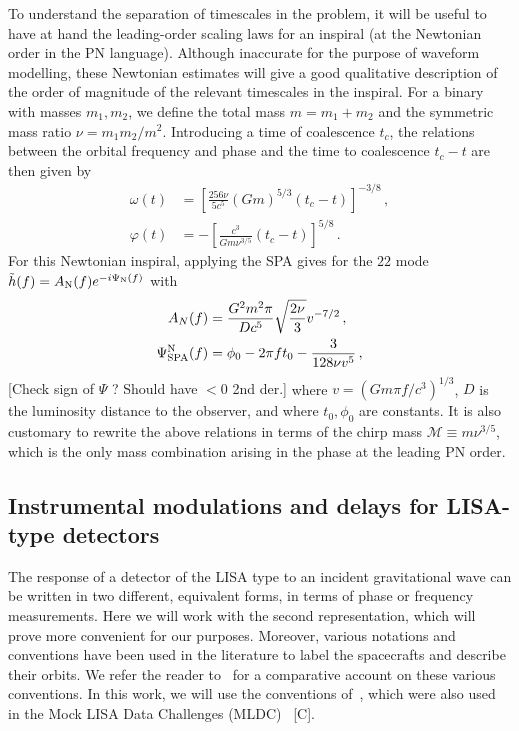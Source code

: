 \documentclass[aps,showpacs,twocolumn,
prd,superscriptaddress,nofootinbib]{revtex4-1}
\newcommand\calM{{\mathcal{M}}}
\newcommand{\SM}[1]{{\color{Red} #1}}
\begin{document}
To understand the separation of timescales in the problem, it will be useful to have at hand the leading-order scaling laws for an inspiral (at the Newtonian order in the PN language). Although inaccurate for the purpose of waveform modelling, these Newtonian estimates will give a good qualitative description of the order of magnitude of the relevant timescales in the inspiral. For a binary with masses $m_{1}, m_{2}$, we define the total mass $m=m_{1}+m_{2}$ and the symmetric mass ratio $\nu = m_{1}m_{2}/m^{2}$. Introducing a time of coalescence $t_{c}$, the relations between the orbital frequency and phase and the time to coalescence $t_{c} - t$ are then given by
\begin{subequations}
\begin{align}
	\omega(t) &= \left[ \frac{256\nu}{5c^{5}} (Gm)^{5/3} (t_{c}-t) \right]^{-3/8} \,, \\
	\varphi(t) &= -\left[ \frac{c^{3}}{G m \nu^{3/5}} (t_{c}-t) \right]^{5/8} \,.
\end{align}
\end{subequations}
For this Newtonian inspiral, applying the SPA gives for the $22$ mode $\tilde{h}(f) = A_{\rm N}(f)e^{-i\Psi_{\rm N}(f)}$ with
\begin{subequations}
\begin{align}
	A_{N}(f) &= \frac{G^{2}m^{2} \pi}{Dc^{5}} \sqrt{\frac{2\nu}{3}} v^{-7/2}\,,\\
	\Psi_{\rm SPA}^{\rm N}(f) &= \phi_{0} - 2\pi f t_{0} - \frac{3}{128\nu v^{5}} \,, 
\end{align}
\end{subequations}
\SM{[Check sign of $\Psi$ ? Should have $<0$ 2nd der.] }
where $v=(G m \pi f/c^{3})^{1/3}$, $D$ is the luminosity distance to the observer, and where $t_{0}, \phi_{0}$ are constants. It is also customary to rewrite the above relations in terms of the chirp mass $\calM \equiv m\nu^{3/5}$, which is the only mass combination arising in the phase at the leading PN order.


\subsection{Instrumental modulations and delays for LISA-type detectors}
\label{subsec:modulationLISA}

The response of a detector of the LISA type to an incident gravitational wave can be written in two different, equivalent forms, in terms of phase or frequency measurements. Here we will work with the second representation, which will prove more convenient for our purposes. Moreover, various notations and conventions have been used in the literature to label the spacecrafts and describe their orbits. We refer the reader to~\cite{Vallisneri04} for a comparative account on these various conventions. In this work, we will use the conventions of~\cite{Vallisneri04}, which were also used in the Mock LISA Data Challenges (MLDC)~\cite{} \SM{[C]}.
\end{document}
